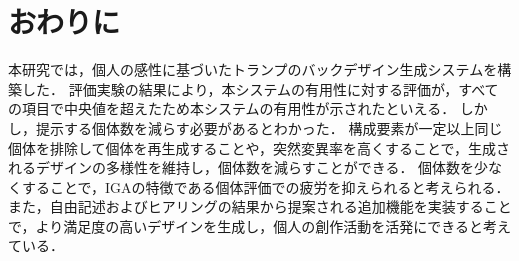 \chapter{おわりに}
本研究では，個人の感性に基づいたトランプのバックデザイン生成システムを構築した．
評価実験の結果により，本システムの有用性に対する評価が，すべての項目で中央値を超えたため本システムの有用性が示されたといえる．
しかし，提示する個体数を減らす必要があるとわかった．
構成要素が一定以上同じ個体を排除して個体を再生成することや，突然変異率を高くすることで，生成されるデザインの多様性を維持し，個体数を減らすことができる．
個体数を少なくすることで，IGAの特徴である個体評価での疲労を抑えられると考えられる．
また，自由記述およびヒアリングの結果から提案される追加機能を実装することで，より満足度の高いデザインを生成し，個人の創作活動を活発にできると考えている．


